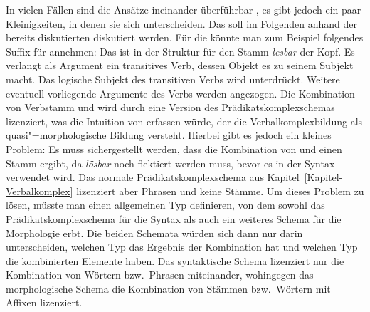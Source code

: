 In vielen Fällen sind die Ansätze ineinander überführbar \parencites[--169]{Koenig99a}[Abschnitt~6.2.5.2]{Mueller2002b},
es gibt jedoch ein paar Kleinigkeiten, in denen sie sich unterscheiden. Das soll im Folgenden
anhand der bereits diskutierten \bard diskutiert werden.
Für die \bard könnte man zum Beispiel folgendes Suffix für  annehmen:
\largerpage
\eas
{}%
\zs
Das \bars ist in der Struktur für den Stamm \emph{lesbar} der Kopf. Es verlangt als Argument ein transitives
Verb, dessen Objekt  es zu seinem Subjekt macht. Das logische Subjekt des transitiven Verbs wird unterdrückt.
Weitere eventuell vorliegende Argumente des Verbs  werden angezogen.
Die Kombination von Verbstamm und  wird durch eine Version des Prädikatskomplexschemas lizenziert,
was die Intuition von \citet{Bierwisch90a} erfassen würde, der die Verbalkomplexbildung als quasi"=morphologische
Bildung versteht. Hierbei gibt es jedoch ein kleines Problem: Es muss sichergestellt werden, dass die Kombination
von  und  einen Stamm ergibt, da \emph{lösbar} noch flektiert werden muss, bevor es in
der Syntax verwendet wird. Das normale Prädikatskomplexschema aus Kapitel~\ref{Kapitel-Verbalkomplex} lizenziert
aber Phrasen und keine Stämme. Um dieses Problem zu lösen, müsste man einen allgemeinen Typ definieren,
von dem sowohl das Prädikatskomplexschema für die Syntax als auch ein weiteres Schema für die Morphologie erbt.
Die beiden Schemata würden sich dann nur darin unterscheiden, welchen Typ das Ergebnis der Kombination hat und
welchen Typ die kombinierten Elemente haben. Das syntaktische Schema lizenziert nur die Kombination von Wörtern
bzw.\ Phrasen miteinander, wohingegen das morphologische Schema die Kombination von Stämmen bzw.\ Wörtern mit
Affixen lizenziert.

